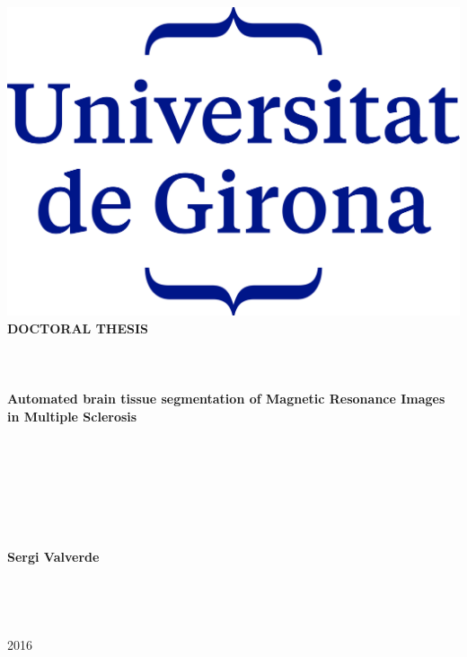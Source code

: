 \hspace{-1.25cm}
\parbox[c]{15cm}{
  \centering
  \includegraphics[scale = 1]{./figures/logo-udg.png}\\
  \vspace{2cm}
  {\textbf{DOCTORAL THESIS}}\\
  \quad \\
  \quad \\ ~\\
  {
    \LARGE \textbf{Automated brain tissue segmentation of Magnetic Resonance Images in Multiple Sclerosis }
  }
  \quad \\
  \quad \\
  \quad \\
  \quad \\
  \quad \\
  \quad \\
  \quad \\
  \quad \\
  \textbf{Sergi Valverde}\\
  \quad \\
  \quad \\
  \quad \\
  \quad \\
  2016\\
  \quad \\
  \quad \\
}
\newpage
~\\

